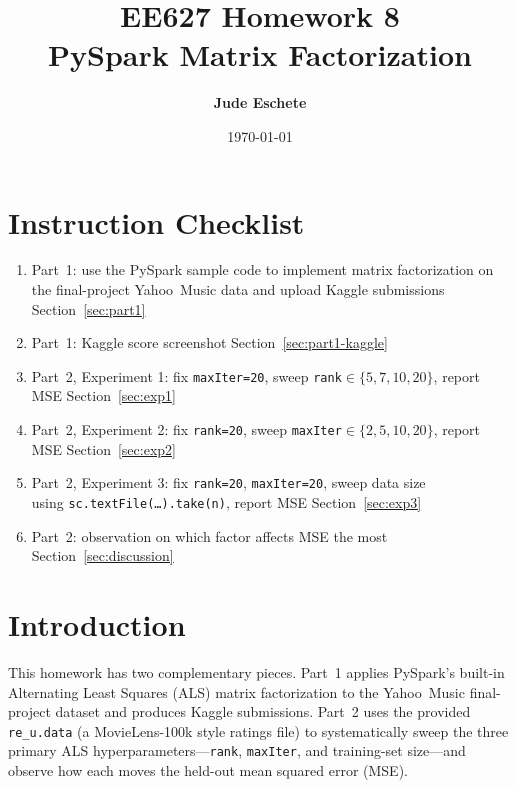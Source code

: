 \documentclass[12pt]{article}
\title{\textbf{EE627 Homework 8\\ PySpark Matrix Factorization}}
\author{\textbf{Jude Eschete}}
\date{\today}
\begin{document}
	\maketitle

	\newpage
	\section*{Instruction Checklist}

	\begin{enumerate}
		\item[\checkmark] Part~1: use the PySpark sample code to implement matrix factorization on the final-project Yahoo~Music data and upload Kaggle submissions \dotfill Section~\ref{sec:part1}
		\item[\checkmark] Part~1: Kaggle score screenshot \dotfill Section~\ref{sec:part1-kaggle}
		\item[\checkmark] Part~2, Experiment 1: fix \texttt{maxIter=20}, sweep \texttt{rank}$\in\{5,7,10,20\}$, report MSE \dotfill Section~\ref{sec:exp1}
		\item[\checkmark] Part~2, Experiment 2: fix \texttt{rank=20}, sweep \texttt{maxIter}$\in\{2,5,10,20\}$, report MSE \dotfill Section~\ref{sec:exp2}
		\item[\checkmark] Part~2, Experiment 3: fix \texttt{rank=20}, \texttt{maxIter=20}, sweep data size \\ using \texttt{sc.textFile(\dots).take(n)}, report MSE \dotfill Section~\ref{sec:exp3}
		\item[\checkmark] Part~2: observation on which factor affects MSE the most \dotfill Section~\ref{sec:discussion}
	\end{enumerate}

	\newpage
	\section{Introduction}

	This homework has two complementary pieces. Part~1 applies PySpark's built-in Alternating Least Squares (ALS) matrix factorization to the Yahoo~Music final-project dataset and produces Kaggle submissions. Part~2 uses the provided \texttt{re\_u.data} (a MovieLens-100k style ratings file) to systematically sweep the three primary ALS hyperparameters---\texttt{rank}, \texttt{maxIter}, and training-set size---and observe how each moves the held-out mean squared error (MSE).
\end{document}
